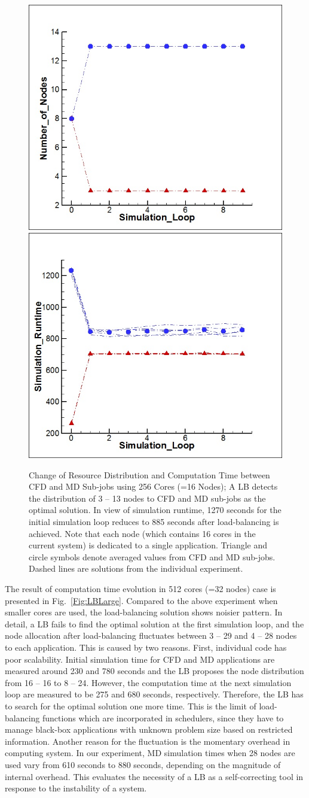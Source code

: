 \documentclass[preprint,12pt]{elsarticle}
\begin{document}
\begin{figure}
\centering
\includegraphics[width=0.3\linewidth]{256_Node.jpg}
\includegraphics[width=0.3\linewidth]{256_Time.jpg}
\caption{\small Change of Resource Distribution and Computation Time
between CFD and MD Sub-jobs using 256 Cores (=16 Nodes); A LB detects
the distribution of 3 -- 13 nodes to CFD and MD sub-jobs as the optimal solution. In view of
 simulation runtime, 1270 seconds for the initial simulation loop reduces to
885 seconds after load-balancing is achieved. Note that each node
(which contains 16 cores in the current system) is dedicated to a single
application. Triangle and circle symbols denote averaged values from CFD
and MD sub-jobs. Dashed lines are solutions from the individual experiment.
}
\label{Fig:LBSmall}
\vspace{-1em}
\end{figure}

The result of computation time evolution in 512 cores (=32 nodes) case is presented 
in Fig.~\ref{Fig:LBLarge}. Compared to the above experiment when smaller cores are used, 
the load-balancing solution shows noisier pattern. In detail, a LB fails to find 
the optimal solution at the first simulation loop, and the node allocation after
load-balancing fluctuates between 3 -- 29 and 4 -- 28 nodes to each application.
This is caused by two reasons. First, individual code has poor scalability.
Initial simulation time for CFD and MD applications are measured around
230 and 780 seconds and the LB proposes the node distribution from 16 -- 16
to 8 -- 24. However, the computation time at the next simulation loop are
measured to be 275 and 680 seconds, respectively. Therefore, the LB has to 
search for the optimal solution one more time. This is the limit of 
load-balancing functions which are incorporated in schedulers, 
since they have to manage black-box applications with unknown problem size
based on restricted information.
Another reason for the fluctuation is the momentary overhead in
computing system. In our experiment, MD simulation times when 28 nodes 
are used vary from 610 seconds to 880 seconds, depending on the magnitude of
internal overhead. This evaluates the necessity of a LB as a self-correcting tool 
in response to the instability of a system.
\end{document}
